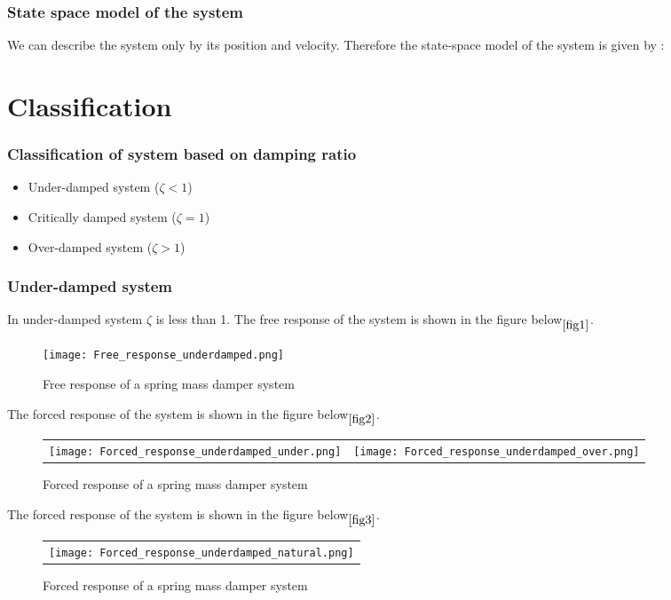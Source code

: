 \documentclass[10pt]{beamer}
\begin{document}
\begin{frame}
\frametitle{State space model of the system}
We can describe the system only by its position and velocity. Therefore the state-space model
of the system is given by :

\end{frame}

\section{Classification}

\begin{frame}
\frametitle{Classification of system based on damping ratio}
\begin{itemize}
	\item{Under-damped system ($\zeta < 1$)}
	\item{Critically damped system ($\zeta = 1$)}
	\item{Over-damped system ($\zeta > 1$)}
\end{itemize}
\end{frame}

\begin{frame}
\frametitle{Under-damped system}
In under-damped system $\zeta$ is less than 1.
The free response of the system is shown in the figure below$\phantom{}_{\ref{fig1}}$.

\begin{figure}[h]
	\centering
	\texttt{[image: Free\_response\_underdamped.png]}
	\caption{Free response of a spring mass damper system}
\end{figure}
\label{fig1}

\end{frame}


\begin{frame}
The forced response of the system is shown in the figure below$\phantom{}_{\ref{fig2}}$.

\begin{figure}[h]
	\begin{tabular} {l c}
	\texttt{[image: Forced\_response\_underdamped\_under.png]} &
	\texttt{[image: Forced\_response\_underdamped\_over.png]} 
	\end{tabular}
	\caption{Forced response of a spring mass damper system}
\end{figure}
\label{fig2}

\end{frame}
 
\begin{frame}
The forced response of the system is shown in the figure below$\phantom{}_{\ref{fig3}}$.

\begin{figure}[h]
	\begin{tabular} {l}
	\texttt{[image: Forced\_response\_underdamped\_natural.png]} 
	\end{tabular}
	\caption{Forced response of a spring mass damper system}
\end{figure}
\label{fig3} 

\end{frame}
\end{document}
